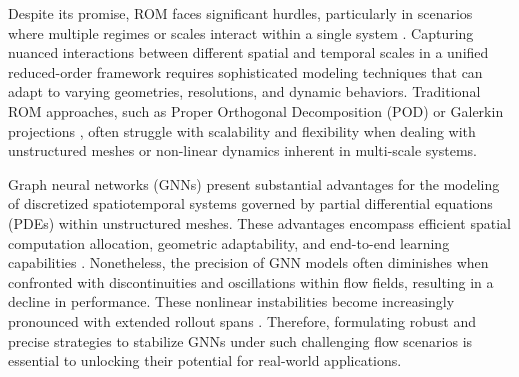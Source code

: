 \documentclass{article}
\begin{document}
Despite its promise, ROM faces significant hurdles, particularly in scenarios where multiple regimes or scales interact within a single system \cite{peng2021multiscale}. Capturing nuanced interactions between different spatial and temporal scales in a unified reduced-order framework requires sophisticated modeling techniques that can adapt to varying geometries, resolutions, and dynamic behaviors. Traditional ROM approaches, such as Proper Orthogonal Decomposition (POD) \cite{berkooz1993proper} or Galerkin projections \cite{peherstorfer2016data, schwerdtner2024nonlinear}, often struggle with scalability and flexibility when dealing with unstructured meshes or non-linear dynamics inherent in multi-scale systems.

Graph neural networks (GNNs) present substantial advantages for the modeling of discretized spatiotemporal systems governed by partial differential equations (PDEs) within unstructured meshes. These advantages encompass efficient spatial computation allocation, geometric adaptability, and end-to-end learning capabilities \cite{pfaff2020learning,allen2022physical,sanchez2020learning, xu2021conditionally,alet2019graph,de2018end,sanchez2018graph}. Nonetheless, the precision of GNN models often diminishes when confronted with discontinuities and oscillations within flow fields, resulting in a decline in performance. These nonlinear instabilities become increasingly pronounced with extended rollout spans \cite{geneva2020modeling,stachenfeld2021learned}. Therefore, formulating robust and precise strategies to stabilize GNNs under such challenging flow scenarios is essential to unlocking their potential for real-world applications.
\end{document}
